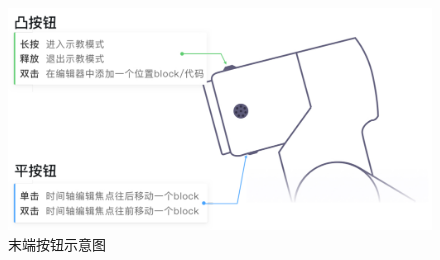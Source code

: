 \begin{figure}[ht]
	\centering
	\includegraphics[width=\textwidth]{image/40.pdf}
	\caption{末端按钮示意图}
	\label{fig:末端按钮示意图}
\end{figure}

